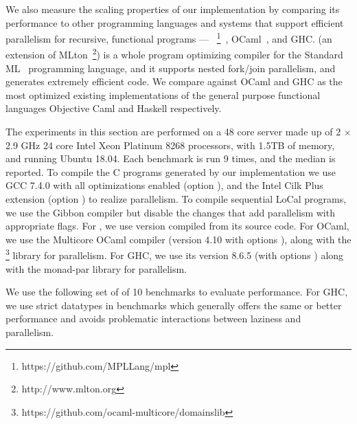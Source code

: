 We also measure the scaling properties of our implementation by comparing its
performance to other programming languages and systems
that support efficient parallelism for recursive, functional programs
--- \MPL{}~\footnote{https://github.com/MPLLang/mpl}~\cite{MPL},
OCaml~\cite{OCaml}, and GHC.
%
\MPL{} (an extension of MLton~\footnote{http://www.mlton.org})
is a whole program optimizing compiler for the Standard ML~\cite{StandardML}
programming language,
%
and it supports nested fork/join parallelism, and generates extremely efficient code.
%
%
We compare against OCaml and GHC as the most optimized existing implementations of the
general purpose functional languages Objective Caml and Haskell respectively.


The experiments in this section are performed on a 48 core server made up of
2 $\times$ 2.9 GHz 24 core Intel Xeon Platinum 8268 processors, with 1.5TB of memory,
and running Ubuntu 18.04.
%
%
Each benchmark is run 9 times, and the median is reported.
%
To compile the C programs generated by our implementation we use
GCC 7.4.0 with all optimizations enabled (option ), and
the Intel Cilk Plus extension (option ) to realize parallelism.
%
To compile sequential LoCal programs, we use the Gibbon compiler but disable the
changes that add parallelism with appropriate flags.
%
For \MPL{}, we use version  compiled from its source code.
%
For OCaml, we use the Multicore OCaml compiler \cite{multicore-ocaml}
(version 4.10 with options ),
along with the  \footnote{https://github.com/ocaml-multicore/domainslib}
library for parallelism.
%
For GHC, we use its version 8.6.5 (with options ) along with
the monad-par\cite{monad-par} library for parallelism.

\newcommand{\numbenchmarks}{\Red{10} }

We use the following set of of 10 benchmarks to evaluate performance.
%
For GHC, we use strict datatypes in benchmarks which generally offers the
same or better performance and avoids problematic interactions between
laziness and parallelism.


